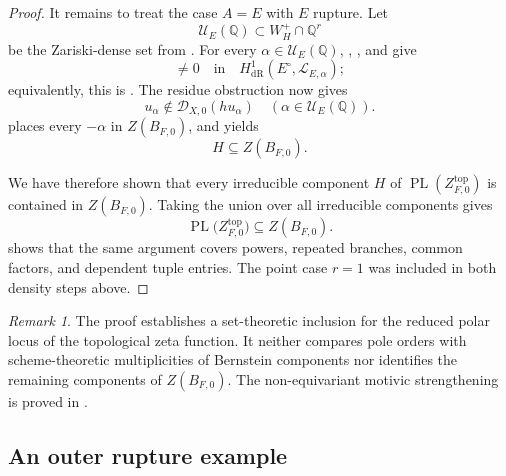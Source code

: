 \documentclass[12pt]{amsart}
\numberwithin{equation}{section}
\theoremstyle{plain}
\theoremstyle{definition}
\theoremstyle{remark}
\newtheorem{remark}[theorem]{Remark}
\theoremstyle{definition}
\DeclareMathOperator{\PL}{PL}
\newcommand{\Q}{\mathbb Q}
\newcommand{\D}{\mathscr D}
\newcommand{\Lcal}{\mathscr L}
\begin{document}
\begin{proof}
It remains to treat the case $A=E$ with $E$ rupture. Let
\begin{equation*}
\mathcal U_E(\Q)\subset W_H^+\cap\Q^r
\end{equation*}
be the Zariski-dense set from . For every $\alpha\in\mathcal U_E(\Q)$, , , and  give
\begin{equation*}
[R_{E,\alpha}]\neq0
 \quad\text{in}\quad
 H^1_{\mathrm{dR}}(E^\circ,\Lcal_{E,\alpha});
\end{equation*}
equivalently, this is . The residue obstruction  now gives
\begin{equation*}
u_\alpha\notin\D_{X,0}(hu_\alpha)
 \quad(\alpha\in\mathcal U_E(\Q)).
\end{equation*}
 places every $-\alpha$ in $Z(B_{F,0})$, and  yields
\begin{equation*}
H\subseteq Z(B_{F,0}).
\end{equation*}

We have therefore shown that every irreducible component $H$ of $\PL(Z^{\mathrm{top}}_{F,0})$ is contained in $Z(B_{F,0})$. Taking the union over all irreducible components gives
\begin{equation*}
\PL\bigl(Z^{\mathrm{top}}_{F,0}\bigr)
  \subseteq Z(B_{F,0}).
\end{equation*}
 shows that the same argument covers powers, repeated branches, common factors, and dependent tuple entries. The point case $r=1$ was included in both density steps above.
\end{proof}

\begin{remark}
The proof establishes a set-theoretic inclusion for the reduced polar locus of the topological zeta function. It neither compares pole orders with scheme-theoretic multiplicities of Bernstein components nor identifies the remaining components of $Z(B_{F,0})$. The non-equivariant motivic strengthening is proved in .
\end{remark}

\subsection{An outer rupture example}
\end{document}
